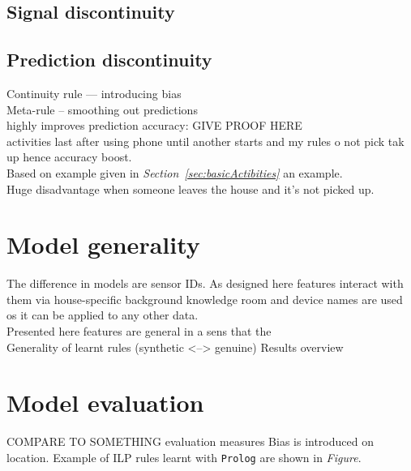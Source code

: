 \documentclass[11pt, a4paper, pdflatex, leqno, twoside, openright]{report}
\begin{document}
    \subsection{Signal discontinuity}

    \subsection{Prediction discontinuity}
Continuity rule --- introducing bias\\
Meta-rule -- smoothing out predictions\\
highly improves prediction accuracy: GIVE PROOF HERE\\
activities last after using phone until another starts and my rules o not pick tak up hence accuracy boost.\\
Based on example given in \emph{Section~\ref{sec:basicActibities}} an example.\\
Huge disadvantage when someone leaves the house and it's not picked up.

  \section{Model generality}
The difference in models are sensor IDs. As designed here features interact with them via house-specific background knowledge room and device names are used os it can be applied to any other data.\\
Presented here features are general in a sens that the\\
Generality of learnt rules (synthetic <--> genuine) Results overview


  \section{Model evaluation}
COMPARE TO SOMETHING
evaluation measures
Bias is introduced on location.
Example of ILP rules learnt with \texttt{Prolog} are shown in \emph{Figure}.

\end{document}
